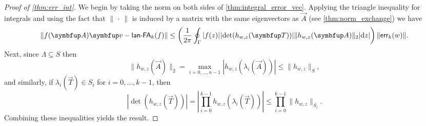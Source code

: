 \begin{proof}[Proof of \cref{thm:err_int}]
    We begin by taking the norm on both sides of \cref{thm:integral_error_vec}.
    Applying the triangle inequality for integrals and using the fact that \( \|\,\cdot\,\| \) is induced by a matrix with the same eigenvectors as \( \vec{A} \) (see \cref{thm:norm_exchange}) we have
\begin{equation}
    \label{eqn:integral_error}
    \| \fA \vec{v} - \lan_k(f) \|
    \leq \left( \frac{1}{2\pi}\oint_{\Gamma} |f(z)|\mkern1mu  |\!\det(h_{w,z}(\vec{T}))|  \| h_{w,z}(\vec{A}) \|_2  |\d{z} | \right) \| \err_k(w) \| .
\end{equation}
Next, since %
\( \Lambda \subseteq S \) then
\begin{equation*}
    \| h_{w,z}(\vec{A}) \|_2 = \max_{i=0,\ldots, n-1} | h_{w,z}(\lambda_i(\vec{A})) | \leq \|h_{w,z}\|_{S},
\end{equation*}
and similarly, if  \( \lambda_i(\vec{T}) \in S_i \) for \( i=0, \ldots , k-1 \), then 
\begin{equation}
    \label{eqn:dkwz_qwz}
    |\!\det(h_{w,z}(\vec{T}))| = \left| \prod_{i=0}^{k-1} h_{w,z}(\lambda_i(\vec{T})) \right| \leq
    \prod_{i=0}^{k-1} \|h_{w,z}\|_{S_i}.
\end{equation}
Combining these inequalities yields the result.
\end{proof}


